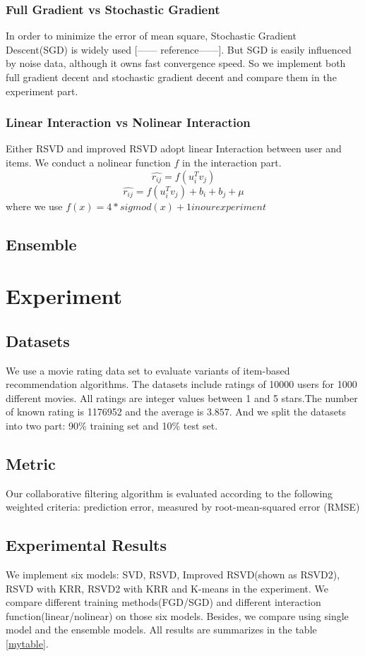 \documentclass[10pt,conference,compsocconf]{IEEEtran}
\begin{document}
\subsubsection{Full Gradient vs Stochastic Gradient}
In order to minimize the error of mean square, Stochastic Gradient Descent(SGD) is widely used [------ reference------]. But SGD is easily influenced by noise data, although it owns fast convergence speed. So we implement both full gradient decent and stochastic gradient decent and compare them in the experiment part.

\subsubsection{Linear Interaction vs Nolinear Interaction}
Either RSVD and improved RSVD adopt linear Interaction between user and items. We conduct a nolinear function $f$ in the interaction part.
$$ \hat{r_{ij}}=f(u_{i}^{T}v_{j})$$
$$ \hat{r_{ij}}=f(u_{i}^{T}v_{j}) + b_i + b_j  + \mu $$
where we use $f(x) = 4*sigmod(x)+1 in our experiment$
\subsection{Ensemble}



\section{Experiment}
\subsection{Datasets}

We use a movie rating data set to evaluate variants of item-based recommendation algorithms. The datasets include ratings of 10000 users for 1000 different movies. All ratings are integer values between 1 and 5 stars.The number of known rating is 1176952 and the average is $3.857$. And we split the datasets into two part: 90\% training set and 10\% test set.

\subsection{Metric}
Our collaborative filtering algorithm is evaluated according to the following weighted criteria:
prediction error, measured by root-mean-squared error (RMSE)

\subsection{Experimental Results}
We implement six models: SVD, RSVD, Improved RSVD(shown as RSVD2), RSVD with KRR, RSVD2 with KRR and K-means in the experiment. We compare different training methods(FGD/SGD) and different interaction
function(linear/nolinear) on those six models. Besides, we compare using single model and the ensemble models. All results are summarizes in the table \ref{mytable}.
\end{document}
